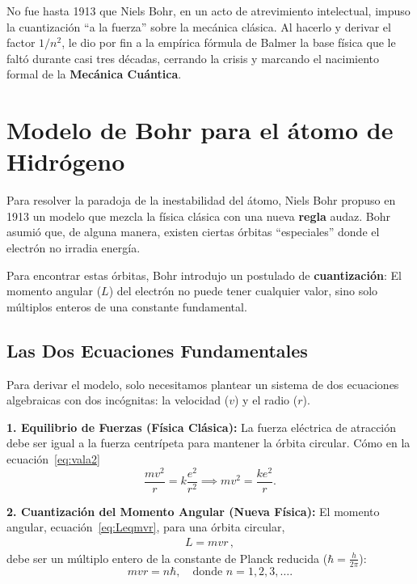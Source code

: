 \documentclass[11pt,a4paper]{book}
\begin{document}
\begin{tcolorbox}[breakable,colback=blue!5!white,colframe=blue!75!black,title=\textbf{Cápsula Histórica: Un Siglo de Magia sin Física}]
No fue hasta 1913 que Niels Bohr, en un acto de atrevimiento intelectual, impuso la cuantización ``a la fuerza'' sobre la mecánica clásica. Al hacerlo y derivar el factor $1/n^2$, le dio por fin a la empírica fórmula de Balmer la base física que le faltó durante casi tres décadas, cerrando la crisis y marcando el nacimiento formal de la \textbf{Mecánica Cuántica}.

\end{tcolorbox}


\section{Modelo de Bohr para el átomo de Hidrógeno}


Para resolver la paradoja de la inestabilidad del átomo, Niels Bohr propuso en 1913 un modelo que mezcla la física clásica con una nueva \textbf{regla} audaz. Bohr asumió que, de alguna manera, existen ciertas órbitas ``especiales'' donde el electrón no irradia energía.

Para encontrar estas órbitas, Bohr introdujo un postulado de \textbf{cuantización}: El momento angular ($L$) del electrón no puede tener cualquier valor, sino solo múltiplos enteros de una constante fundamental.

\subsection{Las Dos Ecuaciones Fundamentales}

Para derivar el modelo, solo necesitamos plantear un sistema de dos ecuaciones algebraicas con dos incógnitas: la velocidad ($v$) y el radio ($r$).

\textbf{1. Equilibrio de Fuerzas (Física Clásica):}
La fuerza eléctrica de atracción debe ser igual a la fuerza centrípeta para mantener la órbita circular. Cómo en la ecuación~\eqref{eq:vala2}
\begin{equation}
    \frac{m v^2}{r} = k \frac{e^2}{r^2} \implies m v^2 = \frac{k e^2}{r}.
    \label{eq:bohr_force}
\end{equation}

\textbf{2. Cuantización del Momento Angular (Nueva Física):}
El momento angular, ecuación~\eqref{eq:Leqmvr}, para una órbita circular,
\begin{align}
  L = mvr\,,
\end{align}
debe ser un múltiplo entero de la constante de Planck reducida ($\hbar = \frac{h}{2\pi}$):
\begin{equation}
    m v r = n \hbar, \quad \text{donde } n = 1, 2, 3, \dots.
    \label{eq:bohr_quant}
\end{equation}
\end{document}
